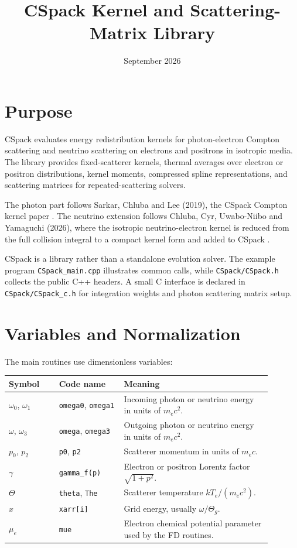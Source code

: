 \documentclass[11pt]{article}
\title{CSpack Kernel and Scattering-Matrix Library}
\author{}
\date{September 2026}
\begin{document}
\maketitle

\section{Purpose}

CSpack evaluates energy redistribution kernels for photon-electron Compton
scattering and neutrino scattering on electrons and positrons in isotropic
media. The library provides fixed-scatterer kernels, thermal averages over
electron or positron distributions, kernel moments, compressed spline
representations, and scattering matrices for repeated-scattering solvers.

The photon part follows Sarkar, Chluba and Lee (2019), the CSpack Compton
kernel paper \cite{SarkarChlubaLee2019}. The neutrino extension follows
Chluba, Cyr, Uwabo-Niibo and Yamaguchi (2026), where the isotropic
neutrino-electron kernel is reduced from the full collision integral to a
compact kernel form and added to CSpack \cite{ChlubaCyrUwaboNiiboYamaguchi2026}.

CSpack is a library rather than a standalone evolution solver. The example
program \texttt{CSpack\_main.cpp} illustrates common calls, while
\texttt{CSpack/CSpack.h} collects the public C++ headers. A small C interface is
declared in \texttt{CSpack/CSpack\_c.h} for integration weights and photon
scattering matrix setup.

\section{Variables and Normalization}

The main routines use dimensionless variables:
\begin{center}
\small
\begin{tabular}{L{0.17\linewidth}L{0.22\linewidth}L{0.50\linewidth}}
\toprule
Symbol & Code name & Meaning \\
\midrule
$\omega_0$, $\omega_1$ & \texttt{omega0}, \texttt{omega1} & Incoming photon or neutrino energy in units of $m_ec^2$. \\
$\omega$, $\omega_3$ & \texttt{omega}, \texttt{omega3} & Outgoing photon or neutrino energy in units of $m_ec^2$. \\
$p_0$, $p_2$ & \texttt{p0}, \texttt{p2} & Scatterer momentum in units of $m_ec$. \\
$\gamma$ & \texttt{gamma\_f(p)} & Electron or positron Lorentz factor $\sqrt{1+p^2}$. \\
$\Theta$ & \texttt{theta}, \texttt{The} & Scatterer temperature $kT_e/(m_ec^2)$. \\
$x$ & \texttt{xarr[i]} & Grid energy, usually $\omega/\Theta_g$. \\
$\mu_e$ & \texttt{mue} & Electron chemical potential parameter used by the FD routines. \\
\bottomrule
\end{tabular}
\end{center}
\end{document}
